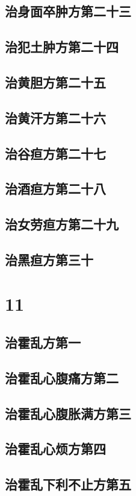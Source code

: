 \documentclass[a4paper,12pt,UTF8,twoside]{ctexbook}
\begin{document}
\chapter{治身面卒肿方第二十三}
\chapter{治犯土肿方第二十四}
\chapter{治黄胆方第二十五}
\chapter{治黄汗方第二十六}
\chapter{治谷疸方第二十七}
\chapter{治酒疸方第二十八}
\chapter{治女劳疸方第二十九}
\chapter{治黑疸方第三十}

\part{11}
\chapter{治霍乱方第一}
\chapter{治霍乱心腹痛方第二}
\chapter{治霍乱心腹胀满方第三}
\chapter{治霍乱心烦方第四}
\chapter{治霍乱下利不止方第五}
\end{document}
